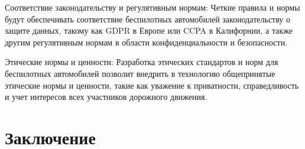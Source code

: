 \documentclass{article}
\begin{document}
\begin{itemize}
\begin{itemize}
        Соответствие законодательству и регулятивным нормам: Четкие правила и нормы будут обеспечивать соответствие беспилотных автомобилей законодательству о защите данных, такому как GDPR в Европе или CCPA в Калифорнии, а также другим регулятивным нормам в области конфиденциальности и безопасности.

        Этические нормы и ценности: Разработка этических стандартов и норм для беспилотных автомобилей позволит внедрить в технологию общепринятые этические нормы и ценности, такие как уважение к приватности, справедливость и учет интересов всех участников дорожного движения.
    \end{itemize}
\end{itemize}


\section{Заключение}




\end{document}
